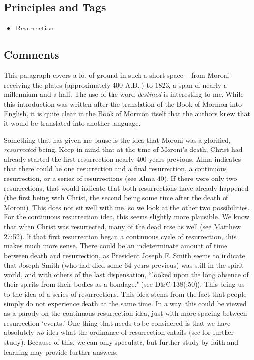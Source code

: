 \documentclass[12pt]{report}
\begin{document}
\subsection{Principles and Tags\label{intro:principles4}}
\begin{itemize}
\item {}Resurrection
\end{itemize}

\subsection{Comments\label{intro:comments4}}
This paragraph covers a lot of ground in such a short space -- from Moroni receiving the plates (approximately 400 \scriptsize A.D. \normalsize) to 1823, a span of nearly a millennium and a half.  The use of the word \emph{destined} is interesting to me.  While this introduction was written after the translation of the Book of Mormon into English, it is quite clear in the Book of Mormon itself that the authors knew that it would be translated into another language.

Something that has given me pause is the idea that Moroni was a glorified, \emph{resurrected} being.  Keep in mind that at the time of Moroni's death, Christ had already started the first resurrection nearly 400 years previous.  Alma indicates that there could be one resurrection and a final resurrection, a continuous resurrection, or a series of resurrections (see Alma 40).  If there were only two resurrections, that would indicate that both resurrections have already happened (the first being with Christ, the second being some time after the death of Moroni).  This does not sit well with me, so we look at the other two possibilities.  For the continuous resurrection idea, this seems slightly more plausible.  We know that when Christ was resurrected, many of the dead rose as well (see Matthew 27:52).  If that first resurrection began a continuous cycle of resurrection, this makes much more sense.  There could be an indeterminate amount of time between death and resurrection, as President Joseph F. Smith seems to indicate that Joseph Smith (who had died some 64 years previous) was still in the spirit world, and with others of the last dispensation, ``looked upon the long absence of their spirits from their bodies as a bondage." (see D\&C 138(:50)).  This bring us to the idea of a series of resurrections.  This idea stems from the fact that people simply do not experience death at the same time.  In a way, this could be viewed as a parody on the continuous resurrection idea, just with more spacing between resurrection `events.'  One thing that needs to be considered is that we have absolutely \emph{no} idea what the ordinance of resurrection entails (see  for further study).  Because of this, we can only speculate, but further study by faith and learning may provide further answers.
\end{document}
